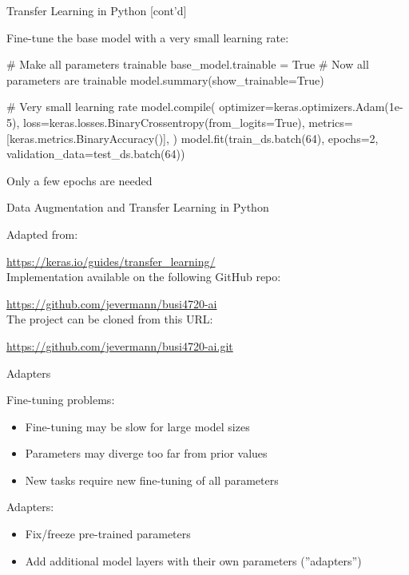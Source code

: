 \documentclass[ignorenonframetext,xcolor=x11names]{beamer}
\begin{document}
\begin{frame}[label=withcode,fragile]{Transfer Learning in Python \small [cont'd]}

Fine-tune the base model with a very small learning rate:
\begin{pythoncode}
# Make all parameters trainable
base_model.trainable = True
# Now all parameters are trainable
model.summary(show_trainable=True)

# Very small learning rate
model.compile(
    optimizer=keras.optimizers.Adam(1e-5),
    loss=keras.losses.BinaryCrossentropy(from_logits=True),
    metrics=[keras.metrics.BinaryAccuracy()],
)
model.fit(train_ds.batch(64), epochs=2, 
          validation_data=test_ds.batch(64))
\end{pythoncode}

\begin{block}{}
Only a few epochs are needed
\end{block}
\end{frame}

\begin{frame}[label=withcode]{Data Augmentation and Transfer Learning in Python}

Adapted from: 

\small\url{https://keras.io/guides/transfer_learning/}\normalsize \\

Implementation available on the following GitHub repo:

\small\url{https://github.com/jevermann/busi4720-ai}\normalsize \\

The project can be cloned from this URL:

\small\url{https://github.com/jevermann/busi4720-ai.git}\normalsize
\end{frame}

\begin{frame}[label=full]{Adapters}

\begin{block}{Fine-tuning problems:}
\begin{itemize}
\item Fine-tuning may be slow for large model sizes
\item Parameters may diverge too far from prior values
\item New tasks require new fine-tuning of all parameters
\end{itemize}
\end{block}

\begin{block}{Adapters:}
\begin{itemize}
\item Fix/freeze pre-trained parameters
\item Add additional model layers with their own parameters (''adapters'')
\end{itemize}
\end{block}
\end{frame}
\end{document}
